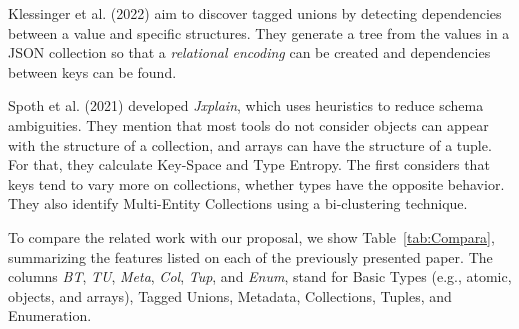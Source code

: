 Klessinger et al. (2022) \nocite{klessinger2022extracting} aim to discover tagged unions by detecting dependencies between a value and specific structures. They generate a tree from the values in a JSON collection so that a \textit{relational encoding} can be created and dependencies between keys can be found.


Spoth et al. (2021) \nocite{Sp+21} developed \textit{Jxplain}, which uses heuristics to reduce schema ambiguities. They mention that most tools do not consider objects can appear with the structure of a collection, and arrays can have the structure of a tuple. For that, they calculate Key-Space and Type Entropy. The first considers that keys tend to vary more on collections, whether types have the opposite behavior. They also identify Multi-Entity Collections using a bi-clustering technique.

To compare the related work with our proposal, we show Table~\ref{tab:Compara}, summarizing the features listed on each of the previously presented paper. The columns \textit{BT}, \textit{TU}, \textit{Meta}, \textit{Col}, \textit{Tup}, and \textit{Enum}, stand for Basic Types (e.g., atomic, objects, and arrays), Tagged Unions, Metadata, Collections, Tuples, and Enumeration. 
%

